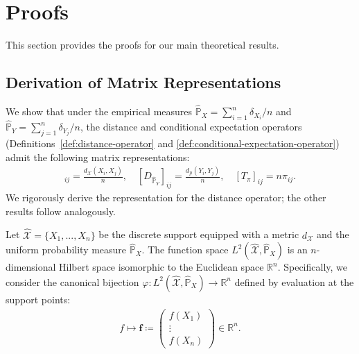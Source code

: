 \documentclass{article}
\theoremstyle{plain}
\theoremstyle{definition}
\theoremstyle{remark}
\begin{document}
\section{Proofs}\label{App:proofs}
This section provides the proofs for our main theoretical results.

\subsection{Derivation of Matrix Representations}\label{pf:matrix-representation}
We show that under the empirical measures $\hat{\mathbb{P}}_X = \sum_{i=1}^{n}\delta_{X_i}/n$ and $\hat{\mathbb{P}}_Y = \sum_{j=1}^{n}\delta_{Y_j}/n$, the distance and conditional expectation operators (Definitions~\ref{def:distance-operator} and \ref{def:conditional-expectation-operator}) admit the following matrix representations:
\begin{align*}
	[D_{\hat{\mathbb{P}}_X}]_{ij} = \frac{d_{\mathcal{X}}(X_i,X_j)}{n}, \quad [D_{\hat{\mathbb{P}}_Y}]_{ij} = \frac{d_{\mathcal{Y}}(Y_i,Y_j)}{n}, \quad [T_{\pi}]_{ij} = n\pi_{ij}.
\end{align*}
We rigorously derive the representation for the distance operator; the other results follow analogously.

Let $\hat{\mathcal{X}} = \{X_1, ..., X_n\}$ be the discrete support equipped with a metric $d_{\mathcal{X}}$ and the uniform probability measure $\hat{\mathbb{P}}_X$. The function space $L^2(\hat{\mathcal{X}}, \hat{\mathbb{P}}_X)$ is an $n$-dimensional Hilbert space isomorphic to the Euclidean space $\mathbb{R}^n$. Specifically, we consider the canonical bijection $\varphi : L^2(\hat{\mathcal{X}}, \hat{\mathbb{P}}_X) \to \mathbb{R}^n$ defined by evaluation at the support points:
\begin{align*}
	f \longmapsto \mathbf{f} \coloneqq \begin{pmatrix} f(X_1) \\ \vdots \\ f(X_n) \end{pmatrix} \in \mathbb{R}^n.
\end{align*}
\end{document}
